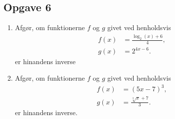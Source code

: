 \subsection*{Opgave 6}
\begin{enumerate}[label=\roman*)]
	\item Afgør, om funktionerne $f$ og $g$ givet ved henholdsvis 
	\begin{align*}
		f(x) &= \frac{\log_2(x)+6}{4},\\
		g(x) &= 2^{4x - 6}.
	\end{align*}
	er hinandens inverse
	\item Afgør, om funktionerne $f$ og $g$ givet ved henholdsvis
	\begin{align*}
		f(x) &= (5x-7)^3,\\
		g(x) &= \frac{\sqrt[3]{x}+7}{3}.
	\end{align*}
	er hinandens inverse.
\end{enumerate}